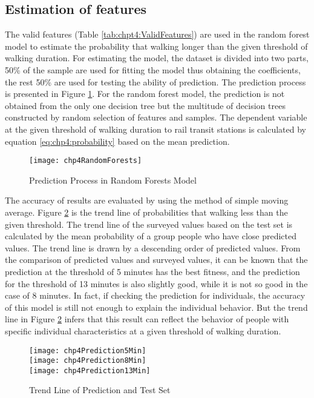 %
\subsection{Estimation of features}
The valid features (Table \ref{tab:chpt4:ValidFeatures}) are used in the random forest model to estimate the probability that walking longer than the given threshold of walking duration. For estimating the model, the dataset is divided into two parts, 50\% of the sample are used for fitting the model thus obtaining the coefficients, the rest 50\% are used for testing the ability of prediction. The prediction process is presented in Figure \ref{fig:chp4:RandomForests}. For the random forest model, the prediction is not obtained from the only one decision tree but the multitude of decision trees constructed by random selection of features and samples. The dependent variable at the given threshold of walking duration to rail transit stations is calculated by equation \ref{eq:chp4:probability} based on the mean prediction.

\begin{figure}[htbp]
	\centering
	\texttt{[image: chp4RandomForests]}
	\caption{Prediction Process in Random Forests Model}
	\label{fig:chp4:RandomForests}
\end{figure}

%
The accuracy of results are evaluated by using the method of simple moving average. Figure \ref{fig:chp4:Prediction} is the trend line of probabilities that walking less than the given threshold. The trend line of the surveyed values based on the test set is calculated by the mean probability of a group people who have close predicted values. The trend line is drawn by a descending order of predicted values. From the comparison of predicted values and surveyed values, it can be known that the prediction at the threshold of 5 minutes has the best fitness, and the prediction for the threshold of 13 minutes is also slightly good, while it is not so good in the case of 8 minutes. In fact, if checking the prediction for individuals, the accuracy of this model is still not enough to explain the individual behavior. But the trend line in Figure \ref{fig:chp4:Prediction} infers that this result can reflect the behavior of people with specific individual characteristics at a given threshold of walking duration. 

\begin{figure}[htbp]
	\centering
	\texttt{[image: chp4Prediction5Min]}\\
	\texttt{[image: chp4Prediction8Min]}\\
	\texttt{[image: chp4Prediction13Min]}\\
	\caption{Trend Line of Prediction and Test Set}
	\label{fig:chp4:Prediction}
\end{figure}

